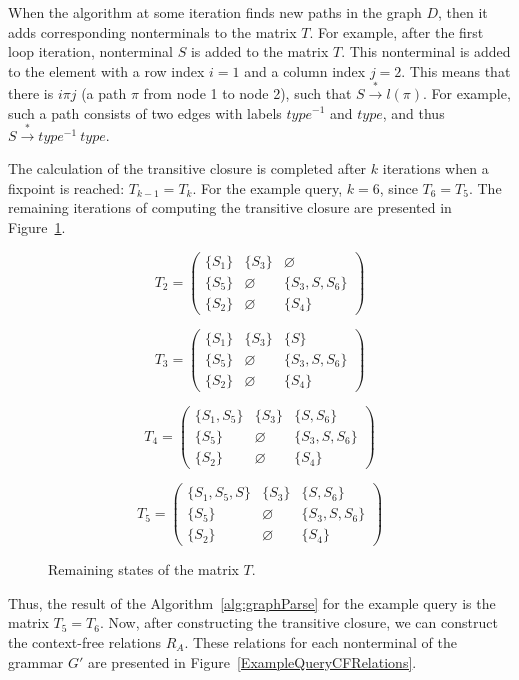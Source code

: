 \documentclass[runningheads,a4paper]{llncs}
\begin{document}
When the algorithm at some iteration finds new paths in the graph $D$, then it adds corresponding nonterminals to the matrix $T$. For example, after the first loop iteration, nonterminal $S$ is added to the matrix $T$. This nonterminal is added to the element with a row index $i = 1$ and a column index $j = 2$. This means that there is $i\pi j$ (a path $\pi$ from node 1 to node 2), such that $S \xrightarrow{*} l(\pi)$. For example, such a path consists of two edges with labels $type^{-1}$ and $type$, and thus $S \xrightarrow{*} type^{-1} \ type$.

The calculation of the transitive closure is completed after $k$ iterations when a fixpoint is reached: $T_{k-1} = T_k$. For the example query, $k = 6$, since $T_6 = T_5$. The remaining iterations of computing the transitive closure are presented in Figure~\ref{ExampleQueryFinalIterations}.

\begin{figure}[h]
	\[
	T_2 = \begin{pmatrix}
	\{S_1\} & \{S_3\} & \varnothing \\ \{S_5\} & \varnothing & \{S_3, S, S_6\} \\ \{S_2\} & \varnothing & \{S_4\}
	\end{pmatrix}
	\]
	
	\[
	T_3 = \begin{pmatrix}
	\{S_1\} & \{S_3\} & \{S\} \\ \{S_5\} & \varnothing & \{S_3, S, S_6\} \\ \{S_2\} & \varnothing & \{S_4\}
	\end{pmatrix}
	\]
	
	\[
	T_4 = \begin{pmatrix}
	\{S_1, S_5\} & \{S_3\} & \{S, S_6\} \\ \{S_5\} & \varnothing & \{S_3, S, S_6\} \\ \{S_2\} & \varnothing & \{S_4\}
	\end{pmatrix}
	\]
	
	\[
	T_5 = \begin{pmatrix}
	\{S_1, S_5, S\} & \{S_3\} & \{S, S_6\} \\ \{S_5\} & \varnothing & \{S_3, S, S_6\} \\ \{S_2\} & \varnothing & \{S_4\}
	\end{pmatrix}
	\]
	\caption{Remaining states of the matrix $T$.}
	\label{ExampleQueryFinalIterations}
\end{figure}

Thus, the result of the Algorithm~\ref{alg:graphParse} for the example query is the matrix $T_5 = T_6$. Now, after constructing the transitive closure, we can construct the context-free relations $R_A$. These relations for each nonterminal of the grammar $G'$ are presented in Figure~\ref{ExampleQueryCFRelations}.
\end{document}
